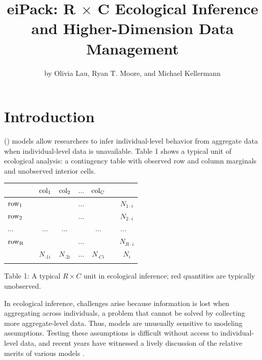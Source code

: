 \title{eiPack: R $\times$ C Ecological
Inference and Higher-Dimension Data Management}
\author{by Olivia Lau, Ryan T. Moore, and Michael Kellermann}

\newcommand{\indep}{{\;\bot\!\!\!\!\!\!\bot\;}}

\maketitle

\section*{Introduction}

 () models allow researchers to infer
individual-level behavior from aggregate data when individual-level
data is unavailable.  Table 1 shows a typical unit of ecological
analysis: a contingency table with observed row and column marginals
and unobserved interior cells.
\begin{center}
\begin{tabular}{l|cccc|c}
	& $\rm{col}_1$ & $\rm{col}_2$ & $\ldots$ & $\rm{col}_C$ & \\
\hline
$\rm{row}_1\quad$	& \color{DarkRed2}{$\;\; N_{11i}\;\;$} & \color{DarkRed2}{$\;\; N_{12i}\;\;$} & $\ldots$ & \color{DarkRed2}{$\;\; N_{1Ci}\;\;$} & $\quad N_{1\cdot i}$ \\
$\rm{row}_2\quad$ 	& \color{DarkRed2}{$N_{21i}$} &
\color{DarkRed2}{$N_{22i}$} &  $\ldots$ &
\color{DarkRed2}{$N_{2Ci}$} & $\quad N_{2\cdot i}$ \\ 
 $\ldots$ & $\ldots$ & $\ldots$ & & $\ldots$ & $\ldots$ \\
$\rm{row}_R\quad$	& \color{DarkRed2}{$N_{R1i}$} & \color{DarkRed2}{$N_{R2i}$} & $\ldots$ &
\color{DarkRed2}{$N_{RCi}$} & $\quad N_{R\cdot i}$ \\ 
\hline
	& $N_{\cdot 1i}$ & $N_{\cdot 2i}$ &  $\ldots$ & $N_{\cdot Ci}$ & $\quad
N_i$\\
\multicolumn{5}{l}{}
\end{tabular} 

Table 1: A typical $R \times C$ unit in ecological inference;
{\color{DarkRed2}red} quantities are typically unobserved.
\end{center}

In ecological inference, challenges arise because information is lost
when aggregating across individuals, a problem that cannot be solved
by collecting more aggregate-level data.  Thus,  models
are unusually sensitive to modeling assumptions. Testing these
assumptions is difficult without access to individual-level data, and
recent years have witnessed a lively discussion of the relative merits
of various models \citep{Wakefield04}.

